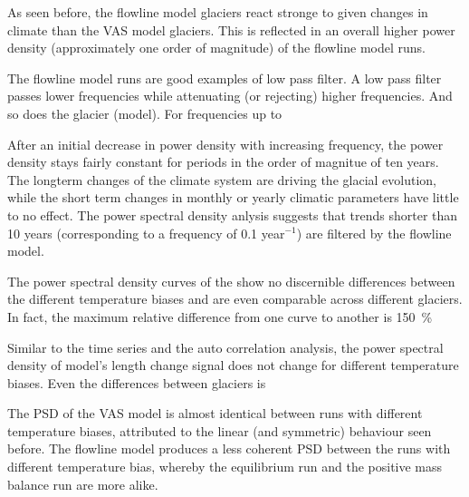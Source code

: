       As seen before, the flowline model glaciers react stronge to given changes in climate than the VAS model glaciers. This is reflected in an overall higher power density (approximately one order of magnitude) of the flowline model runs.

      The flowline model runs are good examples of low pass filter. A low pass filter passes lower frequencies while attenuating (or rejecting) higher frequencies. And so does the glacier (model). For frequencies up to 

      After an initial decrease in power density with increasing frequency, the power density stays fairly constant for periods in the order of magnitue of ten years. The longterm changes of the climate system are driving the glacial evolution, while the short term changes in monthly or yearly climatic parameters have little to no effect. The power spectral density anlysis suggests that trends  shorter than 10 years (corresponding to a frequency of 0.1 year$^{-1}$) are filtered by the flowline model.

      The power spectral density curves of the \vas{} show no discernible differences between the different temperature biases and are even comparable across different glaciers. In fact, the maximum relative difference from one curve to another is \SI{150}{\percent}

      Similar to the time series and the auto correlation analysis, the power spectral density of \vas{} model’s length change signal does not change for different temperature biases. Even the differences between glaciers is 

      The PSD of the VAS model is almost identical between runs with different temperature biases, attributed to the linear (and symmetric) behaviour seen before. The flowline model produces a less coherent PSD between the runs with different temperature bias, whereby the equilibrium run and the positive mass balance run are more alike.


